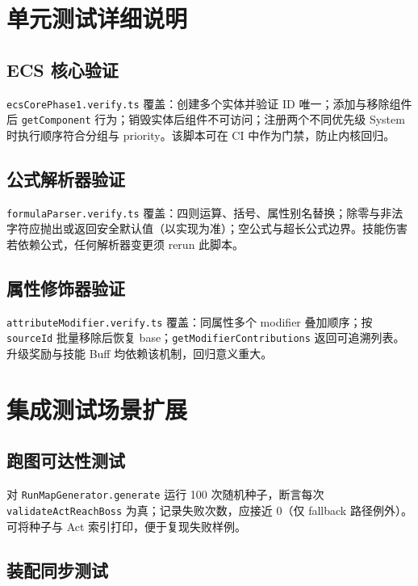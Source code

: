 
\section{单元测试详细说明}

\subsection{ECS 核心验证}

\texttt{ecsCorePhase1.verify.ts} 覆盖：创建多个实体并验证 ID 唯一；添加与移除组件后 \texttt{getComponent} 行为；销毁实体后组件不可访问；注册两个不同优先级 System 时执行顺序符合分组与 priority。该脚本可在 CI 中作为门禁，防止内核回归\cite{kw_software_testing_game}。

\subsection{公式解析器验证}

\texttt{formulaParser.verify.ts} 覆盖：四则运算、括号、属性别名替换；除零与非法字符应抛出或返回安全默认值（以实现为准）；空公式与超长公式边界。技能伤害若依赖公式，任何解析器变更须 rerun 此脚本。

\subsection{属性修饰器验证}

\texttt{attributeModifier.verify.ts} 覆盖：同属性多个 modifier 叠加顺序；按 \texttt{sourceId} 批量移除后恢复 base；\texttt{getModifierContributions} 返回可追溯列表。升级奖励与技能 Buff 均依赖该机制，回归意义重大\cite{kw_attribute_modifier}。

\section{集成测试场景扩展}

\subsection{跑图可达性测试}

对 \texttt{RunMapGenerator.generate} 运行 100 次随机种子，断言每次 \texttt{validateActReachBoss} 为真；记录失败次数，应接近 0（仅 fallback 路径例外）。可将种子与 Act 索引打印，便于复现失败样例\cite{kw_seeded_rng}。

\subsection{装配同步测试}

